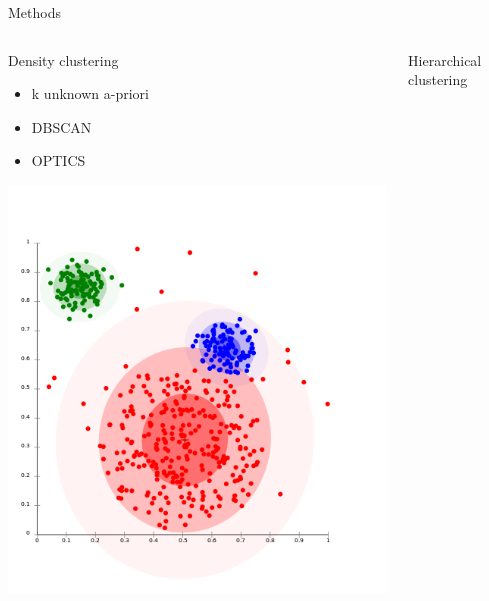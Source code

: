 \documentclass{beamer}\usepackage[]{graphicx}\usepackage[]{color}
\begin{document}
\begin{frame}[fragile]{Methods}
\begin{columns}[t]
\begin{column}{.32\linewidth}
\begin{block}{Density clustering}
{\begin{itemize}
          \item k unknown a-priori
          \item DBSCAN
          \item OPTICS
        \end{itemize}
        \begin{center}
          \includegraphics[width=\linewidth]{clust_dens.png}
        \end{center}}
      \end{block}
    \end{column}
    \begin{column}{.32\linewidth}
      \begin{block}{Hierarchical clustering}
\end{block}
\end{column}
\end{columns}
\end{frame}
\end{document}
